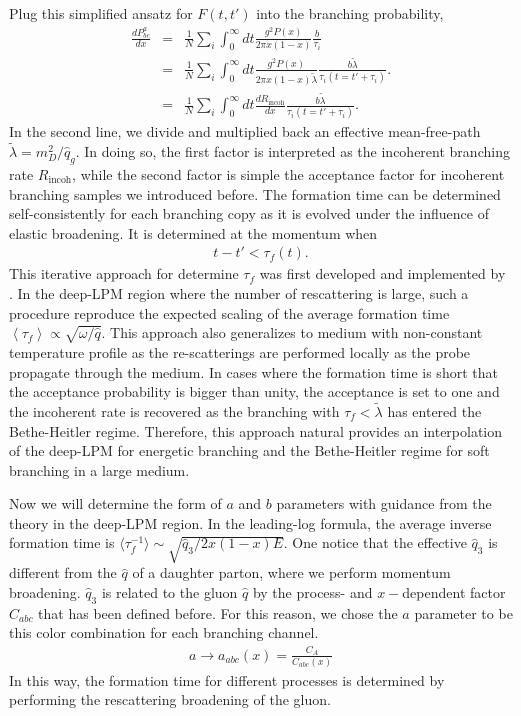 Plug this simplified ansatz for $F(t, t')$ into the branching probability,
\begin{eqnarray}
\frac{dP^{a}_{bc}}{dx} &=& \frac{1}{N}\sum_i \int_0^\infty dt \frac{g^2 P(x)}{2\pi x (1-x)} \frac{b}{\tau_i} \\  
 &=& \frac{1}{N}\sum_i \int_0^\infty dt \frac{g^2 P(x)}{2\pi x (1-x) \tilde{\lambda}} \frac{b \tilde{\lambda}}{\tau_i(t=t'+\tau_i)}.\\
  &=& \frac{1}{N}\sum_i \int_0^\infty dt \frac{dR_{\textrm{incoh}}}{dx} \frac{b \tilde{\lambda}}{\tau_i(t=t'+\tau_i)}.
\end{eqnarray}
In the second line, we divide and multiplied back an effective mean-free-path $\tilde{\lambda} = m_D^2/\hat{q}_g$.
In doing so, the first factor is interpreted as the incoherent branching rate $R_{\textrm{incoh}}$, while the second factor is simple the acceptance factor for incoherent branching samples we introduced before.
The formation time can be determined self-consistently for each branching copy as it is evolved under the influence of elastic broadening.
It is determined at the momentum when
\begin{eqnarray}
t - t' < \tau_f(t). 
\end{eqnarray}
This iterative approach for determine $\tau_f$ was first developed and implemented by \cite{Zapp:2011ya}.
In the deep-LPM region where the number of rescattering is large, such a procedure reproduce the expected scaling of the average formation time $\left\langle\tau_f\right\rangle \propto \sqrt{\omega/\hat{q}}$.
This approach also generalizes to medium with non-constant temperature profile as the re-scatterings are performed locally as the probe propagate through the medium.
In cases where the formation time is short that the acceptance probability is bigger than unity, the acceptance is set to one and the incoherent rate is recovered as the branching with $\tau_f < \tilde{\lambda}$ has entered the Bethe-Heitler regime.
Therefore, this approach natural provides an interpolation of the deep-LPM for energetic branching and the Bethe-Heitler regime for soft branching in a large medium.

Now we will determine the form of $a$ and $b$ parameters with guidance from the theory in the deep-LPM region.
In the leading-log formula, the average inverse formation time is $\langle\tau_f^{-1}\rangle \sim \sqrt{\hat{q}_3 / 2x(1-x)E}$. 
One notice that the effective $\hat{q}_3$ is different from the $\hat{q}$ of a daughter parton, where we perform momentum broadening.
$\hat{q}_3$ is related to the gluon $\hat{q}$ by the process- and $x-$dependent factor $C_{abc}$ that has been defined before.
For this reason, we chose the $a$ parameter to be this color combination for each branching channel.
\begin{eqnarray}
a \rightarrow a_{abc}(x) = \frac{C_A}{C_{abc}(x)}
\end{eqnarray}
In this way, the formation time for different processes is determined by performing the rescattering broadening of the gluon.

